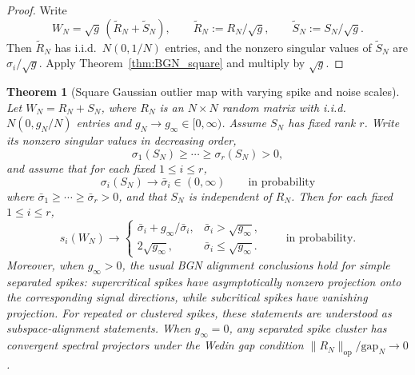 \documentclass[11pt]{article}
\theoremstyle{plain}
\newtheorem{thm}{Theorem}[section]
\theoremstyle{definition}
\theoremstyle{remark}
\newcommand{\op}{\mathrm{op}}
\newcommand{\1}{\mathbf{1}}
\begin{document}
\begin{proof}
Write
\[
W_N=\sqrt g\,(\widetilde R_N+\widetilde S_N),
\qquad
\widetilde R_N:=R_N/\sqrt g,
\qquad
\widetilde S_N:=S_N/\sqrt g.
\]
Then \(\widetilde R_N\) has i.i.d.\ \(N(0,1/N)\) entries, and the nonzero singular values of \(\widetilde S_N\) are \(\sigma_i/\sqrt g\). Apply Theorem~\ref{thm:BGN_square} and multiply by \(\sqrt g\).
\end{proof}

\begin{thm}[Square Gaussian outlier map with varying spike and noise scales]
\label{thm:BGN_square_variable}
Let \(W_N=R_N+S_N\), where \(R_N\) is an \(N\times N\) random matrix with i.i.d.\ \(N(0,g_N/N)\) entries and \(g_N\to g_\infty\in[0,\infty)\). Assume \(S_N\) has fixed rank \(r\). Write its nonzero singular values in decreasing order,
\[
\sigma_1(S_N)\ge\cdots\ge\sigma_r(S_N)>0,
\]
and assume that for each fixed \(1\le i\le r\),
\[
\sigma_i(S_N)\to \bar\sigma_i\in(0,\infty)
\qquad\text{in probability}
\]
where \(\bar\sigma_1\ge\cdots\ge\bar\sigma_r>0\), and that \(S_N\) is independent of \(R_N\).
Then for each fixed \(1\le i\le r\),
\[
s_i(W_N)\to
\begin{cases}
\bar\sigma_i+g_\infty/\bar\sigma_i, & \bar\sigma_i>\sqrt{g_\infty},\\[0.2em]
2\sqrt{g_\infty}, & \bar\sigma_i\le \sqrt{g_\infty}.
\end{cases}
\qquad\text{in probability.}
\]
Moreover, when \(g_\infty>0\), the usual BGN alignment conclusions hold for simple separated spikes: supercritical spikes have asymptotically nonzero projection onto the corresponding signal directions, while subcritical spikes have vanishing projection. For repeated or clustered spikes, these statements are understood as subspace-alignment statements. When \(g_\infty=0\), any separated spike cluster has convergent spectral projectors under the Wedin gap condition \(\|R_N\|_{\op}/\mathrm{gap}_N\to0\).
\end{thm}
\end{document}
